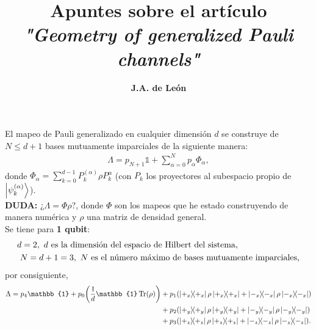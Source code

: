 \documentclass[11pt,letterpaper]{article}
\author{\textbf{J.A. de León}}
\title{\Large Apuntes sobre el artículo \\ \emph{"Geometry of generalized Pauli channels" \cite{siudzinska2020geometry}}}
\date{}
\begin{document}
	\maketitle
	
	El mapeo de Pauli generalizado en cualquier dimensión $d$ se construye de $N\leq d+1$ bases mutuamente imparciales de la siguiente manera: 
	\begin{align*}
		\Lambda = p_{N+1}\mathbb{1}	 + \sum _{\alpha = 0}^{N}p_{\alpha} \Phi _{\alpha},
	\end{align*}
	donde $\Phi_{\alpha}=\sum _{k=0}^{d-1}P_k^{(\alpha)}\rho P_k^{\alpha}$ (con $P_k$ los proyectores al subespacio propio de $\ket{\psi _k^{(\alpha)}}$).\\
	
	\textbf{DUDA:} ¿$\Lambda = \Phi \rho $?, donde $\Phi$ son los mapeos que he estado construyendo de manera numérica y $\rho$ una matriz de densidad general. \\
	
	Se tiene para \textbf{1 qubit}: 
	\begin{align*}
		d = 2,\ \text{$d$ es la dimensión del espacio de Hilbert del sistema,} \hspace{2.55cm} \\
		N = d + 1 = 3,\ \text{$N$ es el número máximo de bases mutuamente imparciales,}
	\end{align*}
	por consiguiente,
	\begin{align*}
	\Lambda = p_4\mathbb{1}	 + p_0\qty( \frac{1}{d} \mathbb{1} \Tr (\rho) ) & + p_1 \qty( \dyad{+_x}{+_x} \rho \dyad{+_x}{+_x} + \dyad{-_x}{-_x} \rho \dyad{-_x}{-_x} ) \\
	& + p_2 \qty( \dyad{+_y}{+_y}\textsl{} \rho \dyad{+_y}{+_y} + \dyad{-_y}{-_y} \rho \dyad{-_y}{-_y} ) \\
	& + p_3 \qty( \dyad{+_z}{+_z} \rho \dyad{+_z}{+_z} + \dyad{-_z}{-_z} \rho \dyad{-_z}{-_z} ).
	\end{align*}
	
\end{document}
